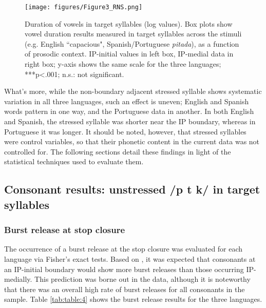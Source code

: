 \documentclass[output=paper]{langscibook}
\begin{document}
\begin{figure}%
\texttt{[image: figures/Figure3\_RNS.png]}
\caption{Duration of vowels in target syllables (log values). Box plots show vowel duration results measured in target syllables across the stimuli (e.g. English ``capacious", Spanish/Portuguese \textit{pitada}), as a function of prosodic context. IP-initial values in left box, IP-medial data in right box; y-axis shows the same scale for the three languages; ***p<.001; n.s.: not significant.}
\label{fig:fig3}
\end{figure}



What’s more, while the non-boundary adjacent stressed syllable shows systematic variation in all three languages, such an effect is uneven; English and Spanish words pattern in one way, and the Portuguese data in another. In both English and Spanish, the stressed syllable was shorter near the IP boundary, whereas in Portuguese it was longer. It should be noted, however, that stressed syllables were control variables, so that their phonetic content in the current data was not controlled for. The following sections detail these findings in light of the statistical techniques used to evaluate them.


\subsection{Consonant results: unstressed /p t k/ in target syllables}
\subsubsection{Burst release at stop closure}

The occurrence of a burst release at the stop closure was evaluated for each language via Fisher’s exact tests. Based on \citet{l01}, it was expected that consonants at an IP-initial boundary would show more burst releases than those occurring IP-medially. This prediction was borne out in the data, although it is noteworthy that there was an overall high rate of burst releases for all consonants in the sample. Table \ref{tab:table:4} shows the burst release results for the three languages.
\end{document}
